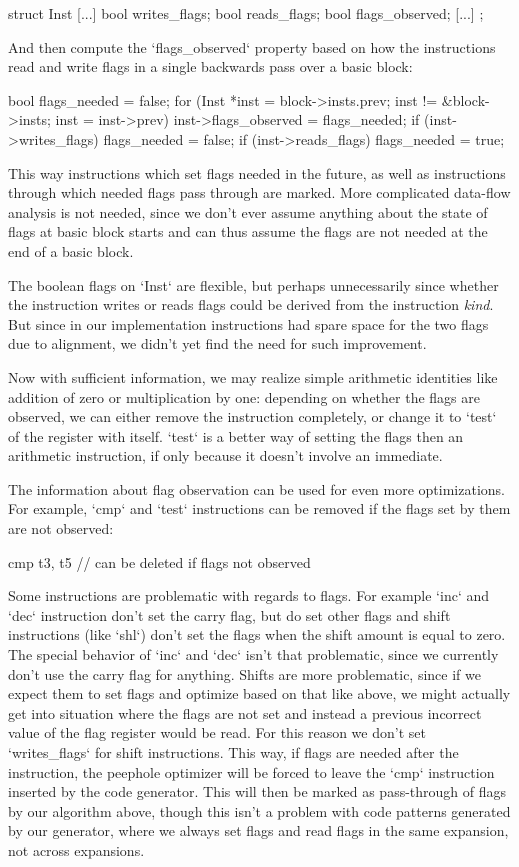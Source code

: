 \begtt
struct Inst {
	[...]
	bool writes_flags;
	bool reads_flags;
	bool flags_observed;
	[...]
};
\endtt

And then compute the `flags_observed` property based on how the instructions
read and write flags in a single backwards pass over a basic block:

\begtt
bool flags_needed = false;
for (Inst *inst = block->insts.prev; inst != &block->insts; inst = inst->prev) {
	inst->flags_observed = flags_needed;
	if (inst->writes_flags)
		flags_needed = false;
	if (inst->reads_flags)
		flags_needed = true;
}
\endtt

This way instructions which set flags needed in the future, as well as
instructions through which needed flags pass through are marked. More
complicated data-flow analysis is not needed, since we don't ever assume
anything about the state of flags at basic block starts and can thus assume the
flags are not needed at the end of a basic block.

The boolean flags on `Inst` are flexible, but perhaps unnecessarily since whether the
instruction writes or reads flags could be derived from the instruction {\em
kind}. But since in our implementation instructions had spare space
for the two flags due to alignment, we didn't yet find the need for such
improvement.

Now with sufficient information, we may realize simple arithmetic identities
like addition of zero or multiplication by one: depending on whether the flags
are observed, we can either remove the instruction completely, or change it to
`test` of the register with itself. `test` is a better way of setting the flags
then an arithmetic instruction, if only because it doesn't involve an immediate.

The information about flag observation can be used for even more optimizations.
For example, `cmp` and `test` instructions can be removed if the flags set by
them are not observed:

\begtt
cmp t3, t5 // can be deleted if flags not observed
\endtt

Some instructions are problematic with regards to flags. For example `inc` and
`dec` instruction don't set the carry flag, but do set other flags and shift
instructions (like `shl`) don't set the flags when the shift amount is equal to
zero. The special behavior of `inc` and `dec` isn't that problematic, since we
currently don't use the carry flag for anything. Shifts are more problematic,
since if we expect them to set flags and optimize based on that like above, we
might actually get into situation where the flags are not set and instead a
previous incorrect value of the flag register would be read. For this reason we
don't set `writes_flags` for shift instructions. This way, if flags are needed
after the instruction, the peephole optimizer will be forced to leave the `cmp`
instruction inserted by the code generator. This will then be marked as
pass-through of flags by our algorithm above, though this isn't a problem with
code patterns generated by our generator, where we always set flags and read
flags in the same expansion, not across expansions.

